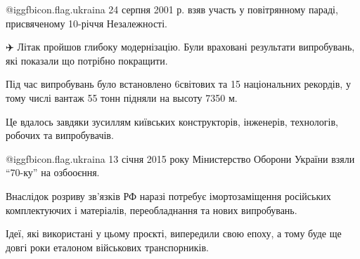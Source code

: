 @igg{fbicon.flag.ukraina} 24 серпня 2001 р.  взяв участь у повітрянному параді,
присвяченому 10-річчя Незалежності. 

✈️ Літак пройшов глибоку модернізацію. Були враховані  результати випробувань,
які показали що потрібно покращити. 

Під час випробувань було встановлено 6світових та 15 національних рекордів, у
тому числі вантаж 55 тонн підняли на высоту 7350 м.

Це вдалось завдяки зусиллям київських конструкторів, інженерів, технологів,
робочих та випробувачів.

@igg{fbicon.flag.ukraina} 13 січня 2015 року Мінистерство Оборони України взяли
\enquote{70-ку} на озбооєння.

Внаслідок розриву зв'язків РФ наразі потребує імортозаміщення російських
комплектуючих і матеріалів, переобладнання та нових випробувань.

Ідеї, які використані у цьому проєкті, випередили свою епоху, а тому буде ще
довгі роки еталоном військових транспорників.
